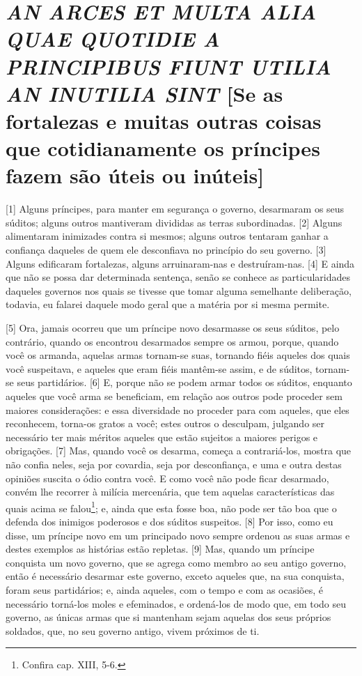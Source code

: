 \quebra\section{\emph{AN ARCES ET MULTA ALIA QUAE QUOTIDIE A PRINCIPIBUS FIUNT UTILIA AN
INUTILIA SINT}
{[}Se as fortalezas e muitas outras coisas que cotidianamente os
príncipes fazem são úteis ou inúteis{]}}

{[}1{]} Alguns príncipes, para manter em segurança o governo, desarmaram
os seus súditos; alguns outros mantiveram divididas as terras
subordinadas. {[}2{]} Alguns alimentaram inimizades contra si mesmos;
alguns outros tentaram ganhar a confiança daqueles de quem ele
desconfiava no princípio do seu governo. {[}3{]} Alguns edificaram
fortalezas, alguns arruinaram-nas e destruíram-nas. {[}4{]} E ainda que
não se possa dar determinada sentença, senão se conhece as
particularidades daqueles governos nos quais se tivesse que tomar alguma
semelhante deliberação, todavia, eu falarei daquele modo geral que a
matéria por si mesma permite.

{[}5{]} Ora, jamais ocorreu que um príncipe novo desarmasse os seus
súditos, pelo contrário, quando os encontrou desarmados sempre os armou,
porque, quando você os armanda, aquelas armas tornam-se suas, tornando
fiéis aqueles dos quais você suspeitava, e aqueles que eram fiéis
mantêm-se assim, e de súditos, tornam-se seus partidários. {[}6{]} E,
porque não se podem armar todos os súditos, enquanto aqueles que você
arma se beneficiam, em relação aos outros pode proceder sem maiores
considerações: e essa diversidade no proceder para com aqueles, que eles
reconhecem, torna-os gratos a você; estes outros o desculpam, julgando
ser necessário ter mais méritos aqueles que estão sujeitos a maiores
perigos e obrigações. {[}7{]} Mas, quando você os desarma, começa a
contrariá-los, mostra que não confia neles, seja por covardia, seja por
desconfiança, e uma e outra destas opiniões suscita o ódio contra você.
E como você não pode ficar desarmado, convém lhe recorrer à milícia
mercenária, que tem aquelas características das quais acima se
falou\footnote{Confira cap. XIII, 5-6.}; e, ainda que esta fosse boa,
não pode ser tão boa que o defenda dos inimigos poderosos e dos súditos
suspeitos. {[}8{]} Por isso, como eu disse, um príncipe novo em um
principado novo sempre ordenou as suas armas e destes exemplos as
histórias estão repletas. {[}9{]} Mas, quando um príncipe conquista um
novo governo, que se agrega como membro ao seu antigo governo, então é
necessário desarmar este governo, exceto aqueles que, na sua conquista,
foram seus partidários; e, ainda aqueles, com o tempo e com as ocasiões,
é necessário torná-los moles e efeminados, e ordená-los de modo que, em
todo seu governo, as únicas armas que si mantenham sejam aquelas dos
seus próprios soldados, que, no seu governo antigo, vivem próximos de
ti.

